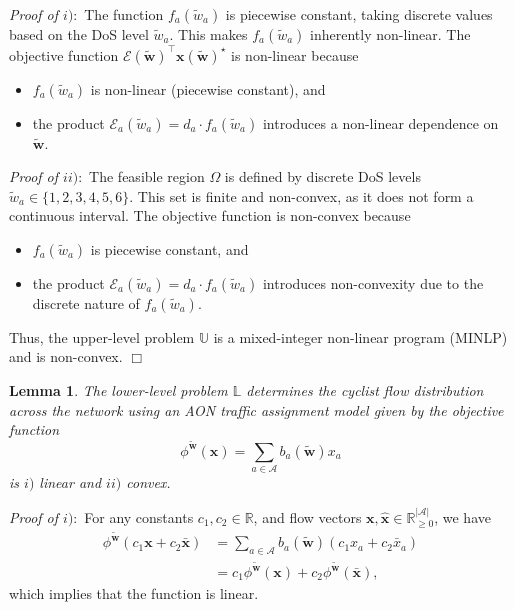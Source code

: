 \documentclass[letterpaper, 10 pt, conference]{ieeeconf}  %
\newtheorem{lemma}{Lemma}
\newcommand{\qedwhite}{\hfill \ensuremath{\Box}}
\begin{document}
\textit{Proof of $i):$} The function $f_a(\tilde{w}_a)$ is piecewise constant, taking discrete values based on the DoS level $\tilde{w}_a$. This makes $f_a(\tilde{w}_a)$ inherently non-linear. The objective function $\mathbf{\mathcal{E}}(\tilde{\mathbf{w}})^\top\mathbf{x}(\tilde{\mathbf{w}})^{\star}$ is non-linear because
\begin{itemize}
    \item $f_a(\tilde{w}_a)$ is non-linear (piecewise constant), and
    \item the product $\mathcal{E}_a(\tilde{w}_a) = d_a \cdot f_a(\tilde{w}_a)$ introduces a non-linear dependence on $\tilde{\mathbf{w}}$.
\end{itemize}

\textit{Proof of $ii):$}
The feasible region $\Omega$ is defined by discrete DoS levels $\tilde{w}_a \in \{1, 2, 3, 4, 5, 6\}$. This set is finite and non-convex, as it does not form a continuous interval. The objective function is non-convex because
\begin{itemize}
    \item $f_a(\tilde{w}_a)$ is piecewise constant, and
    \item the product $\mathcal{E}_a(\tilde{w}_a) = d_a \cdot f_a(\tilde{w}_a)$ introduces non-convexity due to the discrete nature of $f_a(\tilde{w}_a)$.
\end{itemize}
Thus, the upper-level problem $\mathbb{U}$ is a mixed-integer non-linear program (MINLP) and is non-convex. \qedwhite

\begin{lemma}
    The lower-level problem $\mathbb{L}$ determines the cyclist flow distribution across the network using an AON traffic assignment model given by the objective function
    \begin{equation}
        \phi^{\tilde{\mathbf{w}}}(\mathbf{x}) = \sum_{a \in \mathcal{A}} b_{a}(\tilde{\mathbf{w}}) x_{a}
    \end{equation}
    is \textit{$i)$} linear and \textit{$ii)$} convex.
\end{lemma}

\textit{Proof of $i):$} 
For any constants $c_{1},c_{2} \in \mathbb{R}$, and flow vectors $\mathbf{x}, \hat{\mathbf{x}} \in \mathbb{R}^{|\mathcal{A}|}_{\geq 0}$, we have
\begin{align}
\phi^{\tilde{\mathbf{w}}}(c_{1}\mathbf{x} + c_{2}\bar{\mathbf{x}}) & = \sum_{a \in \mathcal{A}} b_{a}(\tilde{\mathbf{w}}) (c_{1}x_{a}+c_{2}\bar{x}_{a}) \\
& = c_{1} \phi^{\tilde{\mathbf{w}}}(\mathbf{x}) + c_{2} \phi^{\tilde{\mathbf{w}}}(\mathbf{\bar{x}}),   
\end{align}
which implies that the function is linear.
\end{document}
